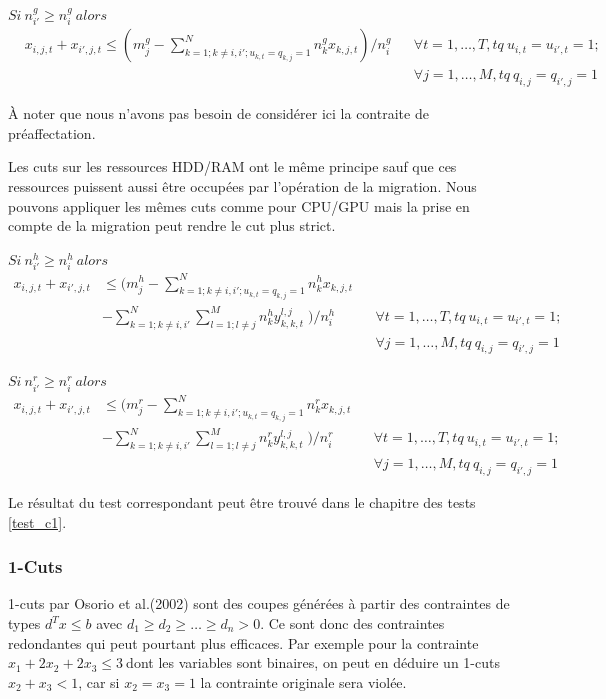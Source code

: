 $Si\ n^g_{i\prime}\geq n^g_{i}\ alors\;$
\begin{align} 
&x_{i,j,t}+x_{i\prime,j,t}\leq (m^g_j-\sum^N_{k=1; k\neq{i},i\prime;u_{k,t}=q_{k,j}=1}{n^g_kx_{k,j,t}})/n^g_i 
&&\forall t=1,\ldots,T, tq\ u_{i,t}=u_{i\prime,t}=1; \nonumber \\
 & &&\forall j=1, \ldots, M, tq\ q_{i,j}=q_{i\prime,j}=1
\end{align} 


À noter que nous n'avons pas besoin de considérer ici la contraite de préaffectation.

Les cuts sur les ressources HDD/RAM ont le même principe sauf que ces ressources puissent aussi être occupées par l'opération de la migration. Nous pouvons appliquer les mêmes cuts comme pour CPU/GPU mais la prise en compte de la migration peut rendre le cut plus strict.
\bigskip

$Si\ n^h_{i\prime}\geq n^h_{i}\ alors\;$
\begin{align}
x_{i,j,t}+x_{i\prime,j,t} &\leq (m^h_j-\sum^N_{k=1;k\neq{i},i\prime;u_{k,t}= q_{k,j}=1}{n^h_kx_{k,j,t}} \nonumber \\
 & - \sum^N_{k=1; k\neq{i},i\prime}{\sum^M_{l=1;l\neq{j}}{n^h_ky^{l,j}_{k,k,t}} }\;)/n^h_i        &&\forall t=1,\ldots,T, tq\ u_{i,t}=u_{i\prime,t}=1;  \nonumber \\
 & &&\forall j=1, \ldots, M, tq\ q_{i,j}=q_{i\prime,j}=1
\end{align}

$Si\ n^r_{i\prime}\geq n^r_{i}\ alors\;$
\begin{align}
x_{i,j,t}+x_{i\prime,j,t} &\leq (m^r_j-\sum^N_{k=1;k\neq{i},i\prime;u_{k,t}= q_{k,j}=1}{n^r_kx_{k,j,t}} \nonumber \\
 & - \sum^N_{k=1; k\neq{i},i\prime}{\sum^M_{l=1;l\neq{j}}{n^r_ky^{l,j}_{k,k,t}} }\;)/n^r_i        &&\forall t=1,\ldots,T, tq\ u_{i,t}=u_{i\prime,t}=1;  \nonumber \\
 & &&\forall j=1, \ldots, M, tq\ q_{i,j}=q_{i\prime,j}=1
\end{align}

Le résultat du test correspondant peut être trouvé dans le chapitre des tests \ref{test_c1}.

\subsubsection{1-Cuts}\label{cut2}
1-cuts par Osorio et al.(2002) sont des coupes générées à partir des contraintes de types $d^Tx \leq b$ avec $d_1  \geq d_2 \geq \dots \geq d_n > 0$. Ce sont donc des contraintes redondantes qui peut pourtant plus efficaces. Par exemple pour la contrainte $x_1+2x_2+2x_3\leq 3 \ $dont les variables sont binaires, on peut en déduire un 1-cuts $x_2+x_3 < 1$, car si $x_2 = x_3=1$ la contrainte originale sera violée.

